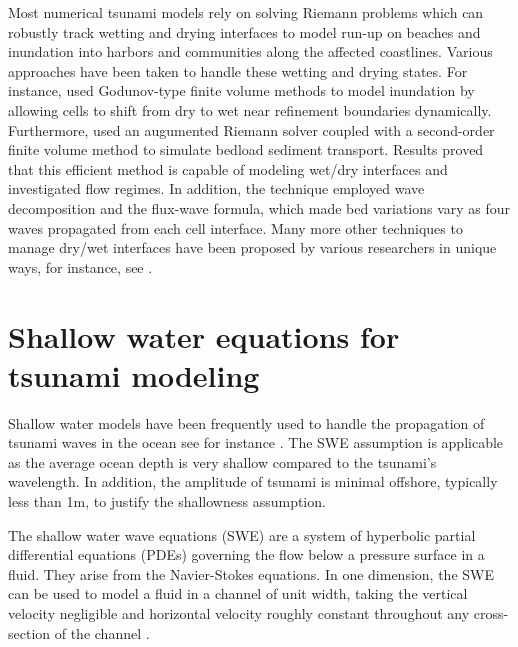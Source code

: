 \documentclass[11pt,a4paper]{article}
\newcommand{\donna}[1]{{\color{red}{#1}}}
\begin{document}
				Most numerical tsunami models rely on solving Riemann problems which can robustly track wetting and drying interfaces to model run-up on beaches and inundation into harbors and communities along the affected coastlines.  Various approaches have been taken to handle these wetting and drying states. For instance, \citet{ge:2011,li-ta-wa-ca-ba-ch-li:2021,fivser2016mass} used Godunov-type finite volume methods to model inundation by allowing cells to shift from dry to wet near refinement boundaries dynamically. Furthermore, \citet{barzgaran2019numerical}  used an augumented Riemann solver coupled with a second-order finite volume method to simulate bedload sediment transport. Results proved that this efficient method is capable of modeling wet/dry interfaces and investigated flow regimes. In addition, the technique employed wave decomposition and the flux-wave formula, which made bed variations vary as four waves propagated from each cell interface. Many more other techniques to manage dry/wet interfaces have been proposed by various researchers in unique ways, for instance, see \citet{po:2015, po:2018, pe-bo-ma:2011, toro2001shock, chaabelasri1849simple,nikolos2009unstructured,huang2013well, bi2014finite,song2011unstructured,buttinger2019fast}.
		

	\section{Shallow water equations for tsunami modeling}
	Shallow water models have been frequently used to handle the propagation of tsunami waves in the ocean see for instance \citet{dutykh2007water,le-ge-be:2011,dias2007dynamics}. The SWE assumption is applicable as the average ocean depth is very shallow compared to the tsunami's wavelength. In addition, the amplitude of tsunami is minimal offshore, typically less than 1m, to justify the shallowness assumption. 
	
		The shallow water wave equations (SWE) are a system of hyperbolic partial differential equations (PDEs) governing the flow below a pressure surface in a fluid. They arise from the Navier-Stokes equations.  In one dimension, the SWE  can be used to model a fluid in a channel of unit width, taking the vertical velocity negligible and horizontal velocity roughly constant throughout any cross-section of the channel \cite{ge:2008}.  
		
\end{document}
